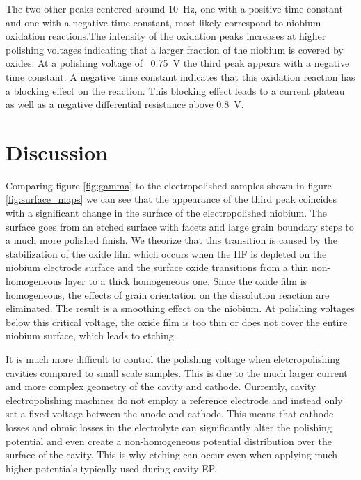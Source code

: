 The two other peaks centered around \qty{10}{\hertz}, one with a positive time constant and one with a negative time constant, most likely correspond to niobium oxidation reactions.The intensity of the oxidation peaks increases at higher polishing voltages indicating that a larger fraction of the niobium is covered by oxides. At a polishing voltage of ~\qty{0.75}{\volt} the third peak appears with a negative time constant. A negative time constant indicates that this oxidation reaction has a blocking effect on the reaction. This blocking effect leads to a current plateau as well as a negative differential resistance above \qty{0.8}{\volt}.



\section{Discussion}

Comparing figure \ref{fig:gamma} to the electropolished samples shown in figure \ref{fig:surface_maps} we can see that the appearance of the third peak coincides with a significant change in the surface of the electropolished niobium. The surface goes from an etched surface with facets and large grain boundary steps to a much more polished finish. We theorize that this transition is caused by the stabilization of the oxide film which occurs when the HF is depleted on the niobium electrode surface and the surface oxide transitions from a thin non-homogeneous layer to a thick homogeneous one. Since the oxide film is homogeneous, the effects of grain orientation on the dissolution reaction are eliminated. The result is a smoothing effect on the niobium. At polishing voltages below this critical voltage, the oxide film is too thin or does not cover the entire niobium surface, which leads to etching.

It is much more difficult to control the polishing voltage when eletcropolishing cavities compared to small scale samples. This is due to the much larger current and more complex geometry of the cavity and cathode. Currently, cavity electropolishing machines do not employ a reference electrode and instead only set a fixed voltage between the anode and cathode. This means that cathode losses and ohmic losses in the electrolyte can significantly alter the polishing potential and even create a non-homogeneous potential distribution over the surface of the cavity. This is why etching can occur even when applying much higher potentials typically used during cavity EP.

